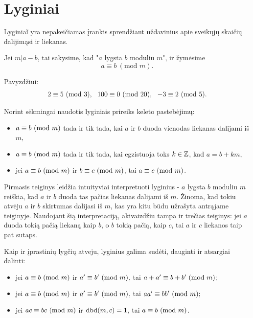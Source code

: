 \newpage
\section{Lyginiai}

Lyginia\~{i} yra nepakeičiamas įrankis sprendžiant uždavinius apie sveikųjų
skaičių dalijimąsi ir liekanas. 

\begin{api} 
  Jei $m|a-b$, tai sakysime, kad "$a$ lygsta $b$ moduliu $m$", ir žymėsime
  $$a\equiv b \ (\text{mod } m).$$
\end{api}

\noindent Pavyzdžiui: $$2\equiv 5 \m{3},\ \ 100\equiv 0 \m{20},\ \ -3\equiv 2
\m{5}.$$ 

Norint sėkmingai naudotis lyginiais prireiks keleto pastebėjimų: 

\begin{itemize} 
  \item $a\equiv b \ (\text{mod } m)$ tada ir tik tada, kai $a$ ir $b$ duoda vienodas
    liekanas dalijami iš $m$, 
  \item $a\equiv b \ (\text{mod } m)$ tada ir tik tada, kai egzistuoja toks $k\in \mathbb Z$,
    kad $a = b +km$, 
  \item jei $a\equiv b \ (\text{mod } m)$ ir $b\equiv c \ (\text{mod } m)$, tai $a\equiv c \ (\text{mod } m)$.
\end{itemize} 

Pirmasis teiginys leidžia intuityviai interpretuoti lyginius - $a$ lygsta
$b$ moduliu $m$ reiškia, kad $a$ ir $b$ duoda tas pačias liekanas dalijami
iš $m$. Žinoma, kad tokiu atvėju $a$ ir $b$ skirtumas dalijasi iš $m$, kas
yra kitu būdu užrašyta antrąjame teiginyje. Naudojant šią interpretaciją,
akivaizdžiu tampa ir trečias teiginys: jei $a$ duoda tokią pačią liekaną
kaip $b$, o $b$ tokią pačią, kaip $c$, tai $a$ ir $c$ liekanos taip pat
sutaps.

Kaip ir įprastinių lygčių atveju, lyginius galima sudėti, dauginti ir
atsargiai dalinti:
\begin{teig}\mbox{}
\begin{itemize} 
  \item jei $a\equiv b \ (\text{mod } m)$ ir $a'\equiv b' \ (\text{mod } m)$, tai $a + a' \equiv b
    + b' \ (\text{mod } m);$ 
  \item jei $a\equiv b \ (\text{mod } m)$ ir $a'\equiv b' \ (\text{mod } m)$, tai $aa' \equiv bb'
    \ (\text{mod } m);$
  \item jei $ac\equiv bc \ (\text{mod } m)$ ir $\operatorname{dbd}(m,c)=1$, tai $a\equiv b \ (\text{mod } m)$.  
\end{itemize} 
\end{teig}

